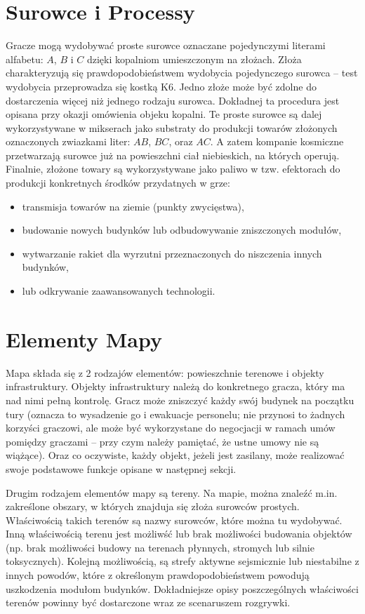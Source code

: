 \documentclass[11pt,a4paper]{article}
\begin{document}
\section{Surowce i Processy}

Gracze mogą wydobywać proste surowce oznaczane pojedynczymi literami alfabetu: $A$, $B$ i $C$ dzięki kopalniom umieszczonym na złożach. Złoża charakteryzują się prawdopodobieństwem wydobycia pojedynczego surowca -- test wydobycia przeprowadza się kostką K6. Jedno złoże może być zdolne do dostarczenia więcej niż jednego rodzaju surowca. Dokładnej ta procedura jest opisana przy okazji omówienia objeku kopalni. Te proste surowce są dalej wykorzystywane w mikserach jako substraty do produkcji towarów złożonych oznaczonych zwiazkami liter: $AB$, $BC$, oraz $AC$. A zatem kompanie kosmiczne przetwarzają surowce już na powieszchni ciał niebieskich, na których operują. Finalnie, złożone towary są wykorzystywane jako paliwo w tzw. efektorach do produkcji konkretnych środków przydatnych w grze:
\begin{itemize}
  \setlength{\parskip}{0pt}
  \setlength{\itemsep}{0pt plus 1pt}
\item transmisja towarów na ziemie (punkty zwycięstwa),
\item budowanie nowych budynków lub odbudowywanie zniszczonych modułów,
\item wytwarzanie rakiet dla wyrzutni przeznaczonych do niszczenia innych budynków,
\item lub odkrywanie zaawansowanych technologii.
\end{itemize}

\section{Elementy Mapy}

Mapa składa się z 2 rodzajów elementów: powieszchnie terenowe i objekty infrastruktury. Objekty infrastruktury należą do konkretnego gracza, który ma nad nimi pełną kontrolę. Gracz może zniszczyć każdy swój budynek na początku tury (oznacza to wysadzenie go i ewakuacje personelu; nie przynosi to żadnych korzyści graczowi, ale może być wykorzystane do negocjacji w ramach umów pomiędzy graczami -- przy czym należy pamiętać, że ustne umowy nie są wiążące). Oraz co oczywiste, każdy objekt, jeżeli jest zasilany, może realizować swoje podstawowe funkcje opisane w następnej sekcji.  

Drugim rodzajem elementów mapy są tereny. Na mapie, można znaleźć m.in. zakreślone obszary, w których znajduja się złoża surowców prostych. Właściwością takich terenów są nazwy surowców, które można tu wydobywać. Inną właściwością terenu jest możliwść lub brak możliwości budowania objektów (np. brak możliwości budowy na terenach płynnych, stromych lub silnie toksycznych). Kolejną możliwością, są strefy aktywne sejsmicznie lub niestabilne z innych powodów, które z określonym prawdopodobieństwem powodują uszkodzenia modułom budynków. Dokładniejsze opisy poszczególnych właściwości terenów powinny być dostarczone wraz ze scenaruszem rozgrywki.
\end{document}
